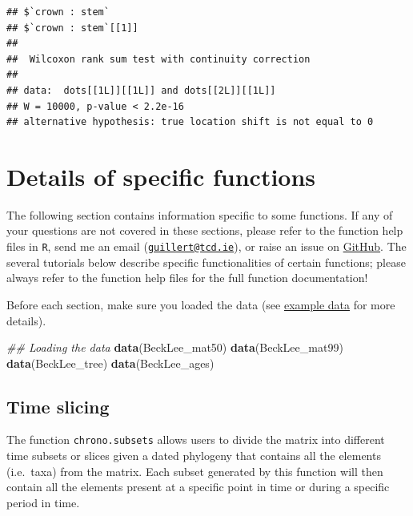 \documentclass[]{book}
\newenvironment{Shaded}{\begin{snugshade}}{\end{snugshade}}
\newcommand{\CommentTok}[1]{\textcolor[rgb]{0.56,0.35,0.01}{\textit{#1}}}
\newcommand{\KeywordTok}[1]{\textcolor[rgb]{0.13,0.29,0.53}{\textbf{#1}}}
\newcommand{\NormalTok}[1]{#1}
\begin{document}
\begin{verbatim}
## $`crown : stem`
## $`crown : stem`[[1]]
## 
##  Wilcoxon rank sum test with continuity correction
## 
## data:  dots[[1L]][[1L]] and dots[[2L]][[1L]]
## W = 10000, p-value < 2.2e-16
## alternative hypothesis: true location shift is not equal to 0
\end{verbatim}

\hypertarget{details-of-specific-functions}{%
\chapter{Details of specific functions}\label{details-of-specific-functions}}

The following section contains information specific to some functions.
If any of your questions are not covered in these sections, please refer to the function help files in \texttt{R}, send me an email (\href{mailto:guillert@tcd.ie}{\nolinkurl{guillert@tcd.ie}}), or raise an issue on \href{https://github.com/TGuillerme/dispRity/issues}{GitHub}.
The several tutorials below describe specific functionalities of certain functions; please always refer to the function help files for the full function documentation!

Before each section, make sure you loaded the \citet{beckancient2014} data (see \protect\hyperlink{example-data}{example data} for more details).

\begin{Shaded}
\begin{Highlighting}[]
\CommentTok{## Loading the data}
\KeywordTok{data}\NormalTok{(BeckLee_mat50)}
\KeywordTok{data}\NormalTok{(BeckLee_mat99)}
\KeywordTok{data}\NormalTok{(BeckLee_tree)}
\KeywordTok{data}\NormalTok{(BeckLee_ages)}
\end{Highlighting}
\end{Shaded}

\hypertarget{chrono-subsets}{%
\section{Time slicing}\label{chrono-subsets}}

The function \texttt{chrono.subsets} allows users to divide the matrix into different time subsets or slices given a dated phylogeny that contains all the elements (i.e.~taxa) from the matrix.
Each subset generated by this function will then contain all the elements present at a specific point in time or during a specific period in time.
\end{document}
